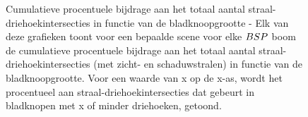 \begin{figure}
  \centering
  \begin{subfigure}{0.48\linewidth}
    \centering
  \end{subfigure}
  \begin{subfigure}{0.48\linewidth}
    \centering
  \end{subfigure}
  \begin{subfigure}{0.48\linewidth}
    \centering
  \end{subfigure}
  \begin{subfigure}{0.48\linewidth}
    \centering
  \end{subfigure}
  \caption[Cumulatieve procentuele bijdrage aan het totaal aantal straal-driehoekintersecties in functie van de bladknoopgrootte]{Cumulatieve procentuele bijdrage aan het totaal aantal straal-driehoekintersecties in functie van de bladknoopgrootte - \small Elk van deze grafieken toont voor een bepaalde scene voor elke $BSP$ boom de cumulatieve procentuele bijdrage aan het totaal aantal straal-driehoekintersecties (met zicht- en schaduwstralen) in functie van de bladknoopgrootte. Voor een waarde van x op de x-as, wordt het procentueel aan straal-driehoekintersecties dat gebeurt in bladknopen met x of minder driehoeken, getoond.}
  \label{fig:vergelijking-blad}
\end{figure}

